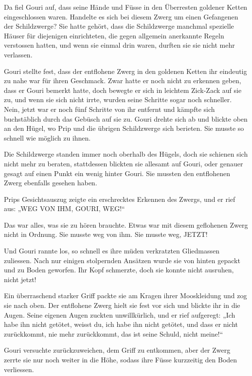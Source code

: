 Da fiel Gouri auf, dass seine Hände und Füsse in den Überresten goldener Ketten eingeschlossen waren. Handelte es sich bei diesem Zwerg um einen Gefangenen der Schildzwerge? Sie hatte gehört, dass die Schildzwerge manchmal spezielle Häuser für diejenigen einrichteten, die gegen allgemein anerkannte Regeln verstossen hatten, und wenn sie einmal drin waren, durften sie sie nicht mehr verlassen.

Gouri stellte fest, dass der entflohene Zwerg in den goldenen Ketten ihr eindeutig zu nahe war für ihren Geschmack. Zwar hatte er noch nicht zu erkennen geben, dass er Gouri bemerkt hatte, doch bewegte er sich in leichtem Zick-Zack auf sie zu, und wenn sie sich nicht irrte, wurden seine Schritte sogar noch schneller. Nein, jetzt war er noch fünf Schritte von ihr entfernt und kämpfte sich buchstäblich durch das Gebüsch auf sie zu. Gouri drehte sich ab und blickte oben an den Hügel, wo Prip und die übrigen Schildzwerge sich berieten. Sie musste so schnell wie möglich zu ihnen.

Die Schildzwerge standen immer noch oberhalb des Hügels, doch sie schienen sich nicht mehr zu beraten, stattdessen blickten sie allesamt auf Gouri, oder genauer gesagt auf einen Punkt ein wenig hinter Gouri. Sie mussten den entflohenen Zwerg ebenfalls gesehen haben.

Prips Gesichtsauszug zeigte ein erschrecktes Erkennen des Zwergs, und er rief aus: „WEG VON IHM, GOURI, WEG!“

Das war alles, was sie zu hören brauchte. Etwas war mit diesem geflohenen Zwerg nicht in Ordnung. Sie musste weg von ihm. Sie musste weg, JETZT!

Und Gouri rannte los, so schnell es ihre müden verkratzten Gliedmassen zuliessen. Nach nur einigen stolpernden Ansätzen wurde sie von hinten gepackt und zu Boden geworfen. Ihr Kopf schmerzte, doch sie konnte nicht ausruhen, nicht jetzt!

Ein überraschend starker Griff packte sie am Kragen ihrer Mooskleidung und zog sie nach oben. Der entflohene Zwerg hielt sie fest vor sich und blickte ihr in die Augen. Seine eigenen Augen zuckten unwillkürlich, und er rief aufgeregt: „Ich habe ihn nicht getötet, weisst du, ich habe ihn nicht getötet, und dass er nicht zurückkommt, nie mehr zurückkommt, das ist seine Schuld, nicht meine!“

Gouri versuchte zurückzuweichen, dem Griff zu entkommen, aber der Zwerg zerrte sie nur noch weiter in die Höhe, sodass ihre Füsse kurzzeitig den Boden verliessen.

